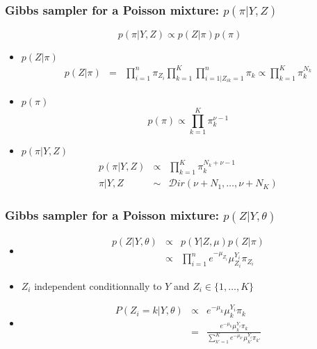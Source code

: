 \begin{frame}\frametitle{Gibbs sampler for a Poisson mixture: $p(\pi | Y,Z)$}


$$ p(\pi | Y,Z) \propto  p(Z | \pi) p(\pi)$$

\begin{itemize}
\item \vert $ p(Z | \pi)$\noir 
   \begin{eqnarray*}
p(Z | \pi) &=& \prod_{i=1}^n \pi_{Z_i} \prod_{k=1}^K\prod_{i=1  | Z_{ik}=1}^n \pi_k \propto    \prod_{k=1}^K \pi_k^{N_k}
 \end{eqnarray*}
\item \vert $ p(\pi)$\noir 
$$p(\pi)\propto  \prod_{k=1}^K \pi_k^{\nu-1}$$
\item \vert $ p(\pi | Y,Z)  $\noir 
\begin{eqnarray*}
 p(\pi| Y,Z) &\propto& \prod_{k=1}^K \pi_k^{N_k + \nu-1}\\ 
 \pi  | Y,Z &\sim& \mathcal{D}ir(\nu +N_1, \dots, \nu + N_K)
\end{eqnarray*}
\end{itemize}
 \end{frame}

\begin{frame}\frametitle{Gibbs sampler for a Poisson mixture: $p(Z | Y, \theta)$}

\begin{itemize}
 \item 
\begin{eqnarray*}
p(Z | Y,\theta) &\propto&  p(Y | Z, \mu) p(Z | \pi) \\
&\propto& \prod_{i=1}^n e^{- \mu_{Z_i}} \mu_{Z_i}^{Y_i}  \pi_{Z_i}
\end{eqnarray*}
\item $Z_i$ independent conditionnally to $Y$ and $Z_i \in \{1, \dots, K\}$
\item 
\begin{eqnarray*}
   P(Z_i = k | Y,\theta)&\propto&  e^{- \mu_{k}} \mu_{k}^{Y_i}  \pi_{k}\\
   & = &  \frac{e^{- \mu_{k}} \mu_{k}^{Y_i}  \pi_{k}}{\sum_{k'=1}^K e^{- \mu_{k'}} \mu_{k'}^{Y_i}  \pi_{k'}}
\end{eqnarray*}
\end{itemize}
\end{frame}

